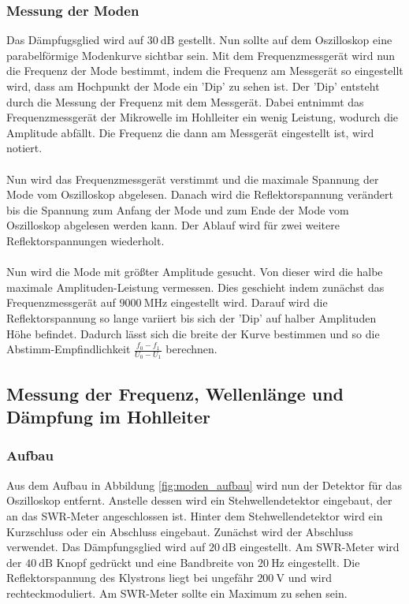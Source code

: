 \subsubsection{Messung der Moden}
\label{sec:moden_durchfuehrung}
Das Dämpfugsglied wird auf $\SI{30}{\dB}$ gestellt.
Nun sollte auf dem Oszilloskop eine parabelförmige Modenkurve sichtbar sein.
Mit dem Frequenzmessgerät wird nun die Frequenz der Mode bestimmt, indem die Frequenz am Messgerät so eingestellt wird, dass am Hochpunkt der Mode ein 'Dip' zu sehen ist.
Der 'Dip' entsteht durch die Messung der Frequenz mit dem Messgerät.
Dabei entnimmt das Frequenzmessgerät der Mikrowelle im Hohlleiter ein wenig Leistung, wodurch die Amplitude abfällt.
Die Frequenz die dann am Messgerät eingestellt ist, wird notiert.
\\\\
Nun wird das Frequenzmessgerät verstimmt und die maximale Spannung der Mode vom Oszilloskop abgelesen.
Danach wird die Reflektorspannung verändert bis die Spannung zum Anfang der Mode und zum Ende der Mode vom Oszilloskop abgelesen werden kann.
Der Ablauf wird für zwei weitere Reflektorspannungen wiederholt.
\\\\
Nun wird die Mode mit größter Amplitude gesucht.
Von dieser wird die halbe maximale Amplituden-Leistung vermessen.
Dies geschieht indem zunächst das Frequenzmessgerät auf $\SI{9000}{\mega\Hz}$ eingestellt wird.
Darauf wird die Reflektorspannung so lange variiert bis sich der 'Dip' auf halber Amplituden Höhe befindet.
Dadurch lässt sich die breite der Kurve bestimmen und so die Abstimm-Empfindlichkeit $\frac{f_0 - f_1}{U_0 - U_1}$ berechnen.

\subsection{Messung der Frequenz, Wellenlänge und Dämpfung im Hohlleiter}
\subsubsection{Aufbau}
\label{sec:aufbau}
Aus dem Aufbau in Abbildung \ref{fig:moden_aufbau} wird nun der Detektor für das Oszilloskop entfernt.
Anstelle dessen wird ein Stehwellendetektor eingebaut, der an das SWR-Meter angeschlossen ist.
Hinter dem Stehwellendetektor wird ein Kurzschluss oder ein Abschluss eingebaut.
Zunächst wird der Abschluss verwendet.
Das Dämpfungsglied wird auf $\SI{20}{\dB}$ eingestellt.
Am SWR-Meter wird der $\SI{40}{\dB}$ Knopf gedrückt und eine Bandbreite von $\SI{20}{\Hz}$ eingestellt.
Die Reflektorspannung des Klystrons liegt bei ungefähr $\SI{200}{\V}$ und wird rechteckmoduliert.
Am SWR-Meter sollte ein Maximum zu sehen sein.


